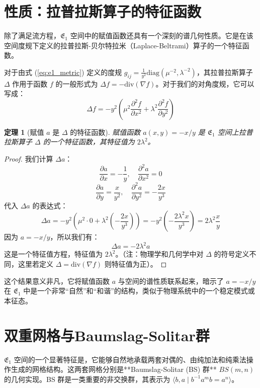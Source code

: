 \documentclass[a4paper,12pt]{book}
\numberwithin{problem}{section}
\numberwithin{definition}{section}
\numberwithin{lemma}{section}
\numberwithin{proposition}{section}
\newtheorem{theorem}{定理}
\numberwithin{theorem}{section}
\numberwithin{grammar}{section}
\numberwithin{program}{section}
\numberwithin{convention}{section}
\numberwithin{corollary}{section}
\begin{document}
\section{性质：拉普拉斯算子的特征函数}
\label{sec:e1_laplacian_eigenfunction}

除了满足流方程，$\mathfrak{E}_1$ 空间中的赋值函数还具有一个深刻的谱几何性质。它是在该空间度规下定义的拉普拉斯-贝尔特拉米（Laplace-Beltrami）算子的一个特征函数。

对于由式 (\ref{eq:e1_metric}) 定义的度规 $g_{ij} = \frac{1}{y^2} \text{diag}(\mu^{-2}, \lambda^{-2})$，其拉普拉斯算子 $\Delta$ 作用于函数 $f$ 的一般形式为 $\Delta f = -\text{div}(\nabla f)$。对于我们的对角度规，它可以写成：
\[ \Delta f = -y^2 \left( \mu^2 \frac{\partial^2 f}{\partial x^2} + \lambda^2 \frac{\partial^2 f}{\partial y^2} \right) \]
\begin{theorem}[赋值 $a$ 是 $\Delta$ 的特征函数]
    \label{thm:e1_eigenfunction}
    赋值函数 $a(x,y) = -x/y$ 是 $\mathfrak{E}_1$ 空间上拉普拉斯算子 $\Delta$ 的一个特征函数，其特征值为 $2\lambda^2$。
\end{theorem}
\begin{proof}
    我们计算 $\Delta a$：
    \[ \frac{\partial a}{\partial x} = -\frac{1}{y}, \quad \frac{\partial^2 a}{\partial x^2} = 0 \]
    \[ \frac{\partial a}{\partial y} = \frac{x}{y^2}, \quad \frac{\partial^2 a}{\partial y^2} = -\frac{2x}{y^3} \]
    代入 $\Delta a$ 的表达式：
    \[ \Delta a = -y^2 \left( \mu^2 \cdot 0 + \lambda^2 \left(-\frac{2x}{y^3}\right) \right) = -y^2 \left(-\frac{2\lambda^2 x}{y^3}\right) = 2\lambda^2 \frac{x}{y} \]
    因为 $a = -x/y$，所以我们有：
    \[ \Delta a = -2\lambda^2 a \]
    这是一个特征值方程，特征值为 $2\lambda^2$。（注：物理学和几何学中对 $\Delta$ 的符号定义不同，这里若定义 $\Delta = \text{div}(\nabla f)$ 则特征值为正）。
\end{proof}
这个结果意义非凡，它将赋值函数 $a$ 与空间的谱性质联系起来，暗示了 $a = -x/y$ 在 $\mathfrak{E}_1$ 中是一个非常“自然”和“和谐”的结构，类似于物理系统中的一个稳定模式或本征态。

\section{双重网格与Baumslag-Solitar群}
\label{sec:e1_dual_grids}

$\mathfrak{E}_1$ 空间的一个显著特征是，它能够自然地承载两套对偶的、由纯加法和纯乘法操作生成的网格结构。这两套网格分别是**Baumslag-Solitar (BS) 群** $BS(m,n)$ 的几何实现。BS 群是一类重要的非交换群，其表示为 $\langle b, a \mid b^{-1}a^m b = a^n \rangle$。
\end{document}
